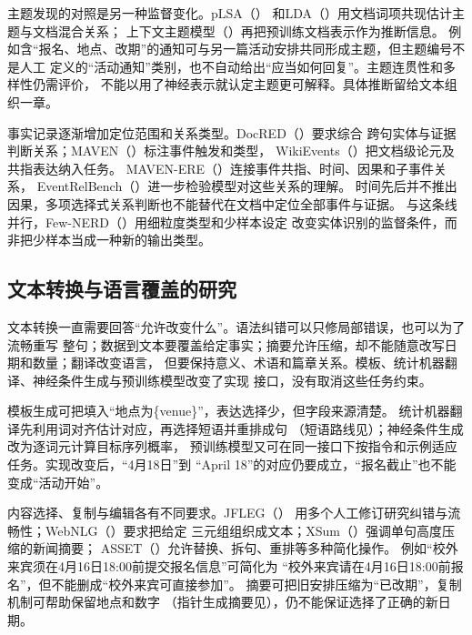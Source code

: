 主题发现的对照是另一种监督变化。pLSA（\citeyear{pgm-static-directed-hofmann1999}）
和LDA（\citeyear{blei2003}）用文档词项共现估计主题与文档混合关系；
上下文主题模型（\citeyear{nlp-intro-bianchi2021}）再把预训练文档表示作为推断信息。
例如含“报名、地点、改期”的通知可与另一篇活动安排共同形成主题，但主题编号不是人工
定义的“活动通知”类别，也不自动给出“应当如何回复”。主题连贯性和多样性仍需评价，
不能以用了神经表示就认定主题更可解释。具体推断留给文本组织一章。

事实记录逐渐增加定位范围和关系类型。DocRED（\citeyear{yao2019docred}）要求综合
跨句实体与证据判断关系；MAVEN（\citeyear{nlp-intro-wang2020maven}）标注事件触发和类型，
WikiEvents（\citeyear{nlp-intro-li2021wikievents}）把文档级论元及共指表达纳入任务。
MAVEN-ERE（\citeyear{nlp-intro-wang2022mavenere}）连接事件共指、时间、因果和子事件关系，
EventRelBench（\citeyear{nlp-intro-gong2025}）进一步检验模型对这些关系的理解。
时间先后并不推出因果，多项选择式关系判断也不能替代在文档中定位全部事件与证据。
与这条线并行，Few-NERD（\citeyear{nlp-intro-ding2021}）用细粒度类型和少样本设定
改变实体识别的监督条件，而非把少样本当成一种新的输出类型。

\subsection{文本转换与语言覆盖的研究}
\label{sec:nlp-history-generation-coverage}

文本转换一直需要回答“允许改变什么”。语法纠错可以只修局部错误，也可以为了流畅重写
整句；数据到文本要覆盖给定事实；摘要允许压缩，却不能随意改写日期和数量；翻译改变语言，
但要保持意义、术语和篇章关系。模板、统计机器翻译、神经条件生成与预训练模型改变了实现
接口，没有取消这些任务约束。

模板生成可把填入“地点为\{venue\}”，表达选择少，但字段来源清楚。
统计机器翻译先利用词对齐估计对应，再选择短语并重排成句
（短语路线见\citeyear{nlp-intro-koehn2003}）；神经条件生成改为逐词元计算目标序列概率，
预训练模型又可在同一接口下按指令和示例适应任务。实现改变后，“4月18日”到
“April 18”的对应仍要成立，“报名截止”也不能变成“活动开始”。

内容选择、复制与编辑各有不同要求。JFLEG（\citeyear{nlp-intro-napoles2017}）
用多个人工修订研究纠错与流畅性；WebNLG（\citeyear{nlp-intro-gardent2017}）要求把给定
三元组组织成文本；XSum（\citeyear{nlp-intro-narayan2018}）强调单句高度压缩的新闻摘要；
ASSET（\citeyear{nlp-intro-alvamanchego2020}）允许替换、拆句、重排等多种简化操作。
例如“校外来宾须在4月16日18:00前提交报名信息”可简化为
“校外来宾请在4月16日18:00前报名”，但不能删成“校外来宾可直接参加”。
摘要可把旧安排压缩为“已改期”，复制机制可帮助保留地点和数字
（指针生成摘要见\citeyear{nlp-intro-see2017}），仍不能保证选择了正确的新日期。

